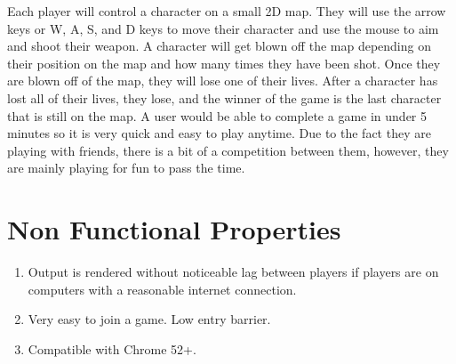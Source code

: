 \documentclass[11pt, oneside]{article}   	%
\begin{document}
Each player will control a character on a small 2D map. They will use the arrow keys or W, A, S, and D keys to move their character and use the mouse to aim and shoot their weapon. A character will get blown off the map depending on their position on the map and how many times they have been shot. Once they are blown off of the map, they will lose one of their lives. After a character has lost all of their lives, they lose, and the winner of the game is the last character that is still on the map. A user would be able to complete a game in under 5 minutes so it is very quick and easy to play anytime. Due to the fact they are playing with friends, there is a bit of a competition between them, however, they are mainly playing for fun to pass the time. \\



\section{Non Functional Properties} 
\begin{enumerate}
\item Output is rendered without noticeable lag between players if players are on computers with a reasonable internet connection. 
\item Very easy to join a game. Low entry barrier. 
\item Compatible with Chrome 52+.
\end{enumerate}
\end{document}
